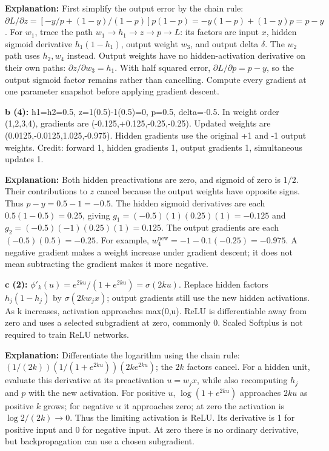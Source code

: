 \documentclass[11pt]{article}
\begin{document}
\textbf{Explanation:} First simplify the output error by the chain rule: $\partial L/\partial z=[-y/p+(1-y)/(1-p)]p(1-p)=-y(1-p)+(1-y)p=p-y$. For $w_1$, trace the path $w_1\to h_1\to z\to p\to L$: its factors are input $x$, hidden sigmoid derivative $h_1(1-h_1)$, output weight $w_3$, and output delta $\delta$. The $w_2$ path uses $h_2,w_4$ instead. Output weights have no hidden-activation derivative on their own paths: $\partial z/\partial w_3=h_1$. With half squared error, $\partial L/\partial p=p-y$, so the output sigmoid factor remains rather than cancelling. Compute every gradient at one parameter snapshot before applying gradient descent.

\textbf{b (4):} h1=h2=0.5, z=1(0.5)-1(0.5)=0, p=0.5, delta=-0.5. In weight order (1,2,3,4), gradients are (-0.125,+0.125,-0.25,-0.25). Updated weights are (0.0125,-0.0125,1.025,-0.975). Hidden gradients use the original +1 and -1 output weights. Credit: forward 1, hidden gradients 1, output gradients 1, simultaneous updates 1.

\textbf{Explanation:} Both hidden preactivations are zero, and sigmoid of zero is $1/2$. Their contributions to $z$ cancel because the output weights have opposite signs. Thus $p-y=0.5-1=-0.5$. The hidden sigmoid derivatives are each $0.5(1-0.5)=0.25$, giving $g_1=(-0.5)(1)(0.25)(1)=-0.125$ and $g_2=(-0.5)(-1)(0.25)(1)=0.125$. The output gradients are each $(-0.5)(0.5)=-0.25$. For example, $w_4^{\mathrm{new}}=-1-0.1(-0.25)=-0.975$. A negative gradient makes a weight increase under gradient descent; it does not mean subtracting the gradient makes it more negative.

\textbf{c (2):} $\phi'_k(u)=e^{2ku}/(1+e^{2ku})=\sigma(2ku)$. Replace hidden factors $h_j(1-h_j)$ by $\sigma(2kw_jx)$; output gradients still use the new hidden activations. As k increases, activation approaches max(0,u). ReLU is differentiable away from zero and uses a selected subgradient at zero, commonly 0. Scaled Softplus is not required to train ReLU networks.

\textbf{Explanation:} Differentiate the logarithm using the chain rule: $(1/(2k))(1/(1+e^{2ku}))(2ke^{2ku})$; the $2k$ factors cancel. For a hidden unit, evaluate this derivative at its preactivation $u=w_jx$, while also recomputing $h_j$ and $p$ with the new activation. For positive $u$, $\log(1+e^{2ku})$ approaches $2ku$ as positive $k$ grows; for negative $u$ it approaches zero; at zero the activation is $\log 2/(2k)\to0$. Thus the limiting activation is ReLU. Its derivative is 1 for positive input and 0 for negative input. At zero there is no ordinary derivative, but backpropagation can use a chosen subgradient.
\end{document}
